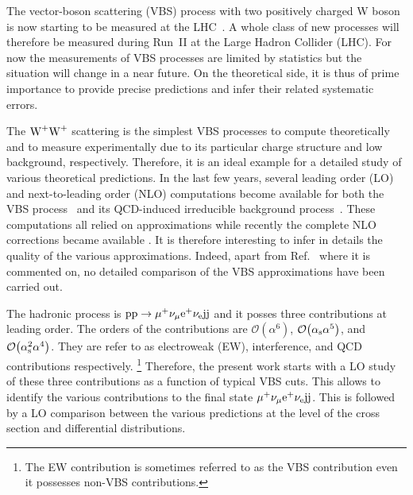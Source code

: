 The vector-boson scattering (VBS) process with two positively charged W boson is now starting to be measured at the LHC~\cite{Aad:2014zda,Aaboud:2016ffv,Khachatryan:2014sta}.
A whole class of new processes will therefore be measured during Run~II at the Large Hadron Collider (LHC).
For now the measurements of VBS processes are limited by statistics but the situation will change in a near future.
On the theoretical side, it is thus of prime importance to provide precise predictions and infer their related systematic errors.

The $\text{W}^+\text{W}^+$ scattering is the simplest VBS processes to compute theoretically and to measure experimentally due to its particular charge structure and low background, respectively.
Therefore, it is an ideal example for a detailed study of various theoretical predictions.
In the last few years, several leading order (LO) and next-to-leading order (NLO) computations become available for both the VBS process~\cite{Jager:2009xx,Jager:2011ms,Denner:2012dz,Rauch:2016pai} and its QCD-induced irreducible background
process~\cite{Melia:2010bm,Melia:2011gk,Campanario:2013gea,Baglio:2014uba,Rauch:2016pai}.
These computations all relied on approximations while recently the complete NLO corrections became available \cite{Biedermann:2017bss}.
It is therefore interesting to infer in details the quality of the various approximations.
Indeed, apart from Ref.~\cite{Biedermann:2017bss} where it is commented on,  no detailed comparison of the VBS approximations have been carried out.

The hadronic process is ${\rm p}{\rm p}\to\mu^+\nu_\mu{\rm e}^+\nu_{\rm e}{\rm j}{\rm j}$ and it posses three contributions at leading order.
The orders of the contributions are $\mathcal{O}{\left(\alpha^{6}\right)}$, $\mathcal{O}{\left(\alpha_{\rm s}\alpha^{5}\right)}$, and $\mathcal{O}{\left(\alpha_\text{s}^{2}\alpha^{4}\right)}$.
They are refer to as electroweak (EW), interference, and QCD contributions respectively.
\footnote{The EW contribution is sometimes referred to as the VBS contribution even it possesses non-VBS contributions.}
Therefore, the present work starts with a LO study of these three contributions as a function of typical VBS cuts.
This allows to identify the various contributions to the final state $\mu^+\nu_\mu{\rm e}^+\nu_{\rm e}{\rm j}{\rm j}$.
This is followed by a LO comparison between the various predictions at the level of the cross section and differential distributions.

